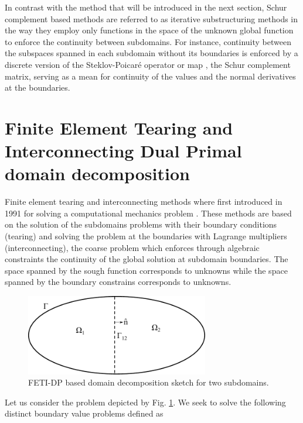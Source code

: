 In contrast with the method that will be introduced in the next section, Schur complement based methods are referred to as  iterative substructuring methods in the way they employ only functions in the space of the unknown global function to enforce the continuity between subdomains. For instance, continuity between the subspaces spanned in each subdomain without its boundaries is enforced by a discrete version of the Steklov-Poicar\'e operator or  map \cite{mathew2008domain}, the Schur complement matrix, serving as a mean for continuity of the values and the normal derivatives at the boundaries.

\section[FETI-DP domain decomposition]{Finite Element Tearing and Interconnecting Dual Primal domain decomposition} \label{sec:FETIDD}


Finite element tearing and interconnecting methods where first introduced in 1991 for solving a computational mechanics problem \cite{farhat1991method}. These methods are based on the solution of the subdomains problems with their boundary conditions (tearing) and solving the problem at the boundaries with Lagrange multipliers (interconnecting), the coarse problem which enforces through algebraic constraints the continuity of the global solution at subdomain boundaries. The space spanned by the sough function corresponds to  unknowns while the space spanned by  the boundary constrains corresponds to  unknowns.

\begin{figure}[ht!]
\centering
\includegraphics[width=8cm]{DDFETI}
\caption{FETI-DP based domain decomposition sketch for two subdomains.}
\label{fig:DDFETI}
\end{figure}

Let us consider the problem depicted by Fig. \ref{fig:DDFETI}. We seek to solve the following distinct boundary value problems defined as

